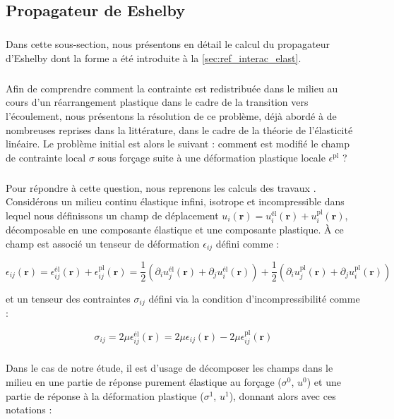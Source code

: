 \subsection{Propagateur de Eshelby}

\label{sec:Annexe_Eshelby}

\subparagraph{}Dans cette sous-section, nous présentons en détail le calcul du propagateur d'Eshelby dont la forme a été introduite à la \autoref{sec:ref_interac_elast}.

\subparagraph{}Afin de comprendre comment la contrainte est redistribuée dans le milieu au cours d'un réarrangement plastique dans le cadre de la transition vers l'écoulement, nous présentons la résolution de ce problème, déjà abordé à de nombreuses reprises dans la littérature, dans le cadre de la théorie de l'élasticité linéaire. Le problème initial est alors le suivant : comment est modifié le champ de contrainte local $\sigma$ sous forçage suite à une déformation plastique locale $\epsilon^\text{pl}$ ?

\subparagraph{}Pour répondre à cette question, nous reprenons les calculs des travaux \cite{picard_elastic_2004, goff_flow_2021}. Considérons un milieu continu élastique infini, isotrope et incompressible dans lequel nous définissons un champ de déplacement $u_i(\mathbf{r}) = u_i^\text{él}(\mathbf{r}) + u_i^\text{pl}(\mathbf{r})$, décomposable en une composante élastique et une composante plastique. \`A ce champ est associé un tenseur de déformation $\epsilon_{ij}$ défini comme :

\begin{equation}
	\epsilon_{ij}(\mathbf{r}) = \epsilon^\text{él}_{ij}(\mathbf{r})+\epsilon^\text{pl}_{ij}(\mathbf{r}) = \frac{1}{2}\left( \partial_i u_j^\text{él}(\mathbf{r}) + \partial_j u_i^\text{él}(\mathbf{r}) \right) + \frac{1}{2}\left( \partial_i u_j^\text{pl}(\mathbf{r}) + \partial_j u_i^\text{pl}(\mathbf{r}) \right)
	\label{eq:tenseurdeformation}
\end{equation}

et un tenseur des contraintes $\sigma_{ij}$ défini via la condition d'incompressibilité comme :

\begin{equation}
	\sigma_{ij} = 2\mu\epsilon^\text{él}_{ij}(\mathbf{r}) = 2\mu\epsilon_{ij}(\mathbf{r}) - 2\mu \epsilon^\text{pl}_{ij}(\mathbf{r})
	\label{eq:tenseurcontrainte}
\end{equation}

\subparagraph{}Dans le cas de notre étude, il est d'usage de décomposer les champs dans le milieu en une partie de réponse purement élastique au forçage ($\sigma^0$, $u^0$) et une partie de réponse à la déformation plastique ($\sigma^1$, $u^1$), donnant alors avec ces notations :


